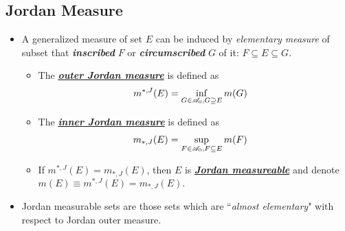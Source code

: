 \documentclass[11pt]{article}
\begin{document}
 \subsection{Jordan Measure}
 \begin{itemize}
 \item  \begin{definition}
 A generalized measure of set $E$ can be induced by \emph{elementary measure} of subset that \emph{\textbf{inscribed}} $F$ or \emph{\textbf{circumscribed}} $G$ of it: $F\subseteq E \subseteq G$. 
 \begin{itemize}
\item The \underline{\emph{\textbf{outer Jordan measure}}} is defined as 
\begin{align*}
m^{*, J}(E) &= \inf\limits_{G\in {\mathscr A}_{0}, G\supseteq E}m(G)
\end{align*}

\item The \underline{\emph{\textbf{inner Jordan measure}}} is defined as 
\begin{align*}
m_{*, J}(E) &= \sup\limits_{F\in {\mathscr A}_{0}, F\subseteq E}m(F)
\end{align*}

\item If $m^{*, J}(E)  = m_{*, J}(E)$, then $E$ is \underline{\emph{\textbf{Jordan measureable}}} and denote $m(E) \equiv m^{*, J}(E)  = m_{*, J}(E). $
\end{itemize} 
\end{definition}

\item \begin{remark}
Jordan measurable sets are those sets which are ``\emph{almost elementary}" with respect to Jordan outer measure.
\end{remark}


\end{itemize}
\end{document}
